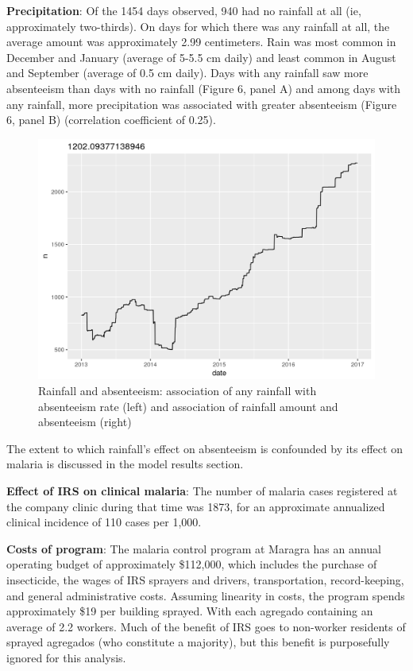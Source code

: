 \documentclass[]{article}
\begin{document}
\textbf{Precipitation}: Of the 1454 days observed, 940 had no rainfall
at all (ie, approximately two-thirds). On days for which there was any
rainfall at all, the average amount was approximately 2.99 centimeters.
Rain was most common in December and January (average of 5-5.5 cm daily)
and least common in August and September (average of 0.5 cm daily). Days
with any rainfall saw more absenteeism than days with no rainfall
(Figure 6, panel A) and among days with any rainfall, more precipitation
was associated with greater absenteeism (Figure 6, panel B) (correlation
coefficient of 0.25).

\begin{figure}[!h]

{\centering \includegraphics{figures/unnamed-chunk-26-1} 

}

\caption{Rainfall and absenteeism: association of any rainfall with absenteeism rate (left) and association of rainfall amount and absenteeism (right)}\label{fig:unnamed-chunk-26}
\end{figure}

The extent to which rainfall's effect on absenteeism is confounded by
its effect on malaria is discussed in the model results section.

\textbf{Effect of IRS on clinical malaria}: The number of malaria cases
registered at the company clinic during that time was 1873, for an
approximate annualized clinical incidence of 110 cases per 1,000.

\textbf{Costs of program}: The malaria control program at Maragra has an
annual operating budget of approximately \$112,000, which includes the
purchase of insecticide, the wages of IRS sprayers and drivers,
transportation, record-keeping, and general administrative costs.
Assuming linearity in costs, the program spends approximately \$19 per
building sprayed. With each agregado containing an average of 2.2
workers. Much of the benefit of IRS goes to non-worker residents of
sprayed agregados (who constitute a majority), but this benefit is
purposefully ignored for this analysis.
\end{document}

